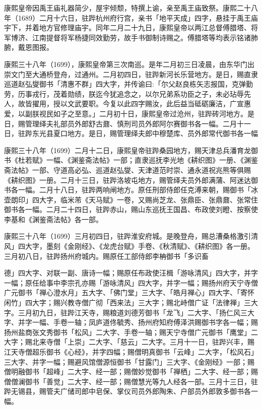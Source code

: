 康熙皇帝因禹王庙礼器简少，屋宇倾颓，特撰上谕，亲至禹王庙致祭。康熙二十八年（1689）二月十六日，驻跸杭州府行宫，亲书「地平天成」四字，悬挂于禹王庙宇下，并着地方官修理庙宇。同年二月二十九日，康熙皇帝以两江总督傅腊塔、将军博济、江南提督将军杨捷同效勤劳，故手书御制诗赐之。傅腊塔等均表示铭诸肺腑，戴恩图报。

康熙三十八年（1699），康熙皇帝第三次南巡。是年二月初三日凌晨，由东华门出崇文门至大通桥登舟，过通州。二月初四日，驻跸新河长乐营地方。是日，赐直隶巡道赵弘燮御书「清惠不群」四大字，并传谕曰:「尔父赵良栋矢志报国，克弹勤劳，历事戎行，茂着勋绩，朕迄今犹追念之，以尔兄弟系功臣之子，未必玷辱先人，故皆擢用，授以文武要职。今复以此四字赐汝，此后益当砥砺廉洁，广宣惠爱，以副朕视民如子之至意。」二月初十日，康熙皇帝过沧州，驻跸砖河地方。是日，赐管理绎夫礼部员外郎舒古鼐、慎刑司员外郎阿尔赛御书各一幅。二月十一日，驻跸东光县夏口地方。是日，赐管理绎夫郎中穆楚库、员外郎常代御书各一幅

康熙三十八年（1699）二月十二日，康熙皇帝驻跸桑园地方，赐天津总兵潘育龙御书《杜若赋》一幅、《渊鉴斋法帖》一部；直隶巡抚李光地《耕织图》一册、《渊鉴斋法帖》一部、守道高必弘、巡道赵弘燮、天津道范时崇、通永道祝兆熊等俱赐《耕织图》一册。二月十三日，驻跸洛坡屯地方，赐管绎夫员外郎满蒲、阿迷达御书各一幅。二月十八日，驻跸两响闸地方。原任刑部侍郎任克溥来朝，赐御书「冰壶朗印」四大字，临米芾《天马赋》一卷，又赐尚芝龙、张鼎臣、张鼎鼐、张常住御书各一幅。二月二十四日，驻跸赤山，赐山东巡抚王国昌、布政使刘瞪、按察使李基和《渊鉴斋法帖》各一部。

康熙三十八年（1699）三月初四日，驻跸淮安府城。是晚登舟，赐总漕桑格激引清风」四大字，墨刻《金刚经》、《龙虎台赋》手卷、《秋清赋》、《耕织图》各一册。三月初八日，驻跸扬州府城内。赐原任工部侍郎李柟御书「多识畜


\noindent 德」四大字、对联一副、唐诗一幅；赐原任布政使汪楫「游咏清风」四大字，并字一幅；原任给事中李宗孔亦赐「游咏清风」四大字，并字一幅；赐扬州府天宁寺僧广元御书「禅心澄水月」五大字、「佛门堂」三大字、「皓月禅心」四大字、「寄怀闲竹」四大字；赐兴教寺僧广彻「西来法」三大字；赐北峙僧广证「法律禅」三大字。三月初九日，驻跸江天寺，赐粮道刘德芳御书「龙飞」二大字、「扬仁风三大字、并字一幅、手卷一轴；凤庐道佟毓秀、扬州府知府傅泽洪赐御书字各一幅；赐扬州盐商张文秀御书「松风」二大字、手卷一轴；赐天宁寺僧广元御书「鹰堂」二大字；赐北来寺僧「上崇」二大字、「慈云」二大字。三月十一日，驻跸兴丰，赐江天寺僧超乐御书《心经》，并字四幅；赐僧明真御书「云峰」二大字，「松风石」三大字、并字一幅；赐避风馆僧源恒御书「甘露门」三大字、《金刚经》一部；赐僧明融御书「超峰」二大字、经一部；赐僧妙觉御书「禅栖」二大字、经一部；赐僧僧澜御书「善觉」二大字、经一部；赐僧慧光等九人经各一部。三月十三日，驻跸无锡县，赐管夫广储司郎中皂保、掌仪司员外郎陶朱、户部员外郎敦多御书各一幅。

